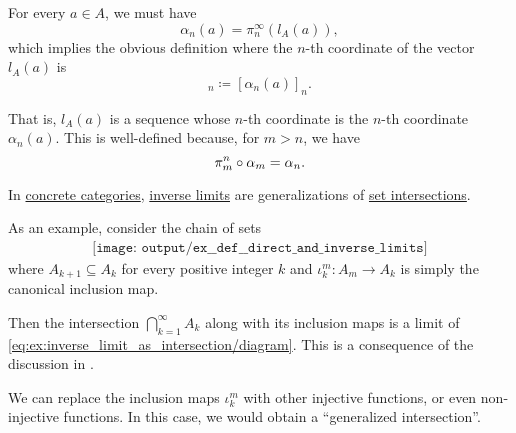 \begin{example}
\begin{thmenum}
    For every \( a \in A \), we must have
    \begin{equation*}
      \alpha_n(a) = \pi_n^\infty(l_A(a)),
    \end{equation*}
    which implies the obvious definition where the \( n \)-th coordinate of the vector \( l_A(a) \) is
    \begin{equation*}
      [l_A(a)]_n \coloneqq [\alpha_n(a)]_n.
    \end{equation*}

    That is, \( l_A(a) \) is a sequence whose \( n \)-th coordinate is the \( n \)-th coordinate \( \alpha_n(a) \). This is well-defined because, for \( m > n \), we have
    \begin{equation*}
      \pi_m^n \bincirc \alpha_m = \alpha_n.
    \end{equation*}

     In \hyperref[def:concrete_category]{concrete categories}, \hyperref[def:direct_and_inverse_limits/inverse]{inverse limits} are generalizations of \hyperref[thm:zfc_existence_theorems/arbitrary_intersection]{set intersections}.

    As an example, consider the chain of sets
    \begin{equation}\label{eq:ex:inverse_limit_as_intersection/diagram}
      \begin{aligned}
        \texttt{[image: output/ex\_\_def\_\_direct\_and\_inverse\_limits]}
      \end{aligned}
    \end{equation}
    where \( A_{k+1} \subseteq A_k \) for every positive integer \( k \) and \( \iota_k^m: A_m \to A_k \) is simply the canonical inclusion map.

    Then the intersection \( \bigcap_{k=1}^\infty A_k \) along with its inclusion maps is a limit of \eqref{eq:ex:inverse_limit_as_intersection/diagram}. This is a consequence of the discussion in .

    We can replace the inclusion maps \( \iota_k^m \) with other injective functions, or even non-injective functions. In this case, we would obtain a \enquote{generalized intersection}.
  \end{thmenum}
\end{example}

